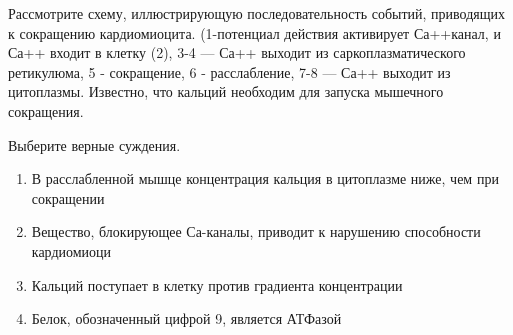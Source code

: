 
Рассмотрите схему,
иллюстрирующую последовательность событий, приводящих к сокращению
кардиомиоцита. (1-потенциал действия активирует Са++канал, и Са++ входит в
клетку (2), 3-4 — Са++ выходит из саркоплазматического ретикулюма, 5 -
сокращение, 6 - расслабление, 7-8 — Са++ выходит из цитоплазмы. Известно, что кальций необходим для
запуска мышечного сокращения.

Выберите верные суждения.


\begin{enumerate}
    \item В расслабленной мышце концентрация кальция в цитоплазме ниже, чем при сокращении
    \item Вещество, блокирующее Са-каналы, приводит к нарушению способности кардиомиоци
    \item Кальций поступает в клетку против градиента концентрации
    \item Белок, обозначенный цифрой 9, является АТФазой
\end{enumerate}

